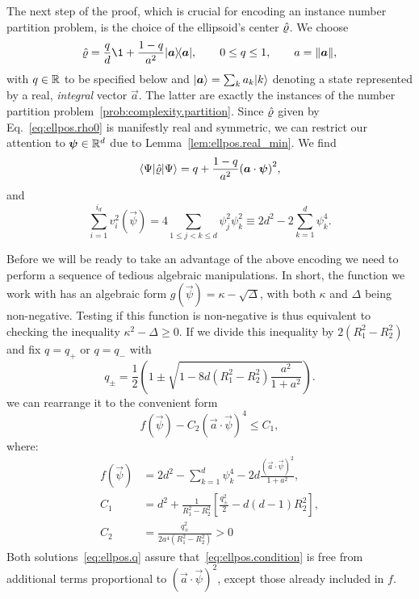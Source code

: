 The next step of the proof, which is crucial for encoding an instance number partition problem, is the choice of the ellipsoid's center $\hat{\varrho}$.
We choose
\[
  \estim{\varrho}=\frac{q}{d}\1+\frac{1-q}{a^{2}} \ket{\vec a} \bra{\vec a},\qquad0\leq q\leq1,\qquad a=\norm{\vec a},
  \label{eq:ellpos.rho0}
\]
with $q \in {\mathbb{R}}$ to be specified below and $\ket{\vec a} =\sum_{k}a_{k}\ket{k} $ denoting a state represented by a real, \emph{integral} vector $\vec{a}$.
The latter are exactly the instances of the number partition problem~\ref{prob:complexity.partition}.
Since $\hat{\varrho}$ given by Eq.~\eqref{eq:ellpos.rho0} is manifestly real and symmetric, we can restrict our attention to ${\boldsymbol{\psi}} \in {\mathbb{R}}^d$ due to Lemma~\ref{lem:ellpos.real_min}. We find
\[
  \bra{\Psi}\estim{\varrho} \ket{\Psi} =q+\frac{1-q}{a^{2}}{\left(\vec{a}\cdot\vec{\psi}\right)}^{2},
\]
and
\[
  \sum_{i=1}^{i_{d}}v_{i}^{2}\left(\vec\psi\right)=4\sum_{1\leq j<k\leq d}\psi_{j}^{2}\psi_{k}^{2}\equiv2d^{2}-2\sum_{k=1}^{d}\psi_{k}^{4}.
\]

Before we will be ready to take an advantage of the above encoding we need to perform a sequence of tedious algebraic manipulations.
In short, the function we work with has an algebraic form $g(\vec\psi)=\kappa-\sqrt{\Delta}$, with both $\kappa$ and $\Delta$ being non-negative.
Testing if this function is non-negative is thus equivalent to checking the inequality $\kappa^2- \Delta\geq 0$. If we divide this inequality by $2(R_1^2-R_2^2)$ and fix $q=q_+$ or $q=q_-$ with
\[
  q_{\pm}=\frac{1}{2}\left(1\pm\sqrt{1-8d\left(R_{1}^{2}-R_{2}^{2}\right)\frac{a^{2}}{1+a^{2}}}\right).\label{eq:ellpos.q}
\]
we can rearrange it to the convenient form
\[
  f\left(\vec{\psi}\right)-C_{2}{\left(\vec{a}\cdot\vec{\psi}\right)}^{4}\leq C_{1},
  \label{eq:ellpos.condition}
\]
where:
\begin{align}
  f\left(\vec{\psi}\right) &= 2d^{2}-\sum_{k=1}^{d}\psi_{k}^{4}-2d\frac{{\left(\vec{a}\cdot\vec{\psi}\right)}^{2}}{1+a^{2}}, \\
  \label{eq:ellpos.def_c1}
  C_{1}&=d^{2}+\frac{1}{R_{1}^{2}-R_{2}^{2}}\left[\frac{q_{\pm}^{2}}{2}-d\left(d-1\right)R_{2}^{2}\right], \\
  C_{2}&=\frac{q_{\mp}^{2}}{2a^{4}\left(R_{1}^{2}-R_{2}^{2}\right)}>0
\end{align}
Both solutions~\eqref{eq:ellpos.q} assure that~\eqref{eq:ellpos.condition} is free from additional terms proportional to ${\left(\vec{a}\cdot\vec{\psi}\right)}^{2}$, except those already included in $f$.

